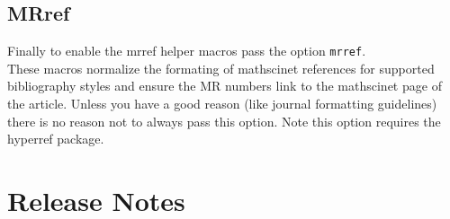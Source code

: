 \documentclass[leqno,11pt]{amsart}
\begin{document}
\subsection{MRref}

Finally to enable the mrref helper macros pass the option \verb=mrref=.\\  These macros normalize the formating of mathscinet references for supported bibliography styles and ensure the MR numbers link to the mathscinet page of the article.  Unless you have a good reason (like journal formatting guidelines) there is no reason not to always pass this option.  Note this option requires the hyperref package.


\section{Release Notes}
\end{document}
